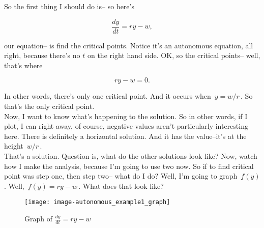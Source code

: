So the first thing I should do is-- so here's

\begin{equation*}
  \frac{dy}{dt} = ry - w, 
\end{equation*}

our equation-- is find the critical points.
Notice it's an autonomous equation, all right,
because there's no $t$ on the right hand side.
OK, so the critical points--
well, that's where

\begin{equation*}
  ry - w = 0.
\end{equation*}

In other words, there's only one critical point.
And it occurs when $\, y =  w/r\,$.
So that's the only critical point.\\
Now, I want to know what's happening to the solution.
So in other words, if I plot, I can right away,
of course, negative values aren't particularly interesting here.
There is definitely a horizontal solution.
And it has the value--it's at the height $\, w/r \,$.\\
That's a solution.
Question is, what do the other solutions look like?
Now, watch how I make the analysis, because I'm going to use two now.
So if to find critical point was step one, then step two--
what do I do?
Well, I'm going to graph $\, f(y)$.
Well, $\, f(y) =  ry - w\, $.
What does that look like?

\begin{wrapfigure}{r}{5.5cm}
  \texttt{[image: image-autonomous\_example1\_graph]}
  \caption{Graph of $\frac{dy}{dt} = ry - w$}
\end{wrapfigure}


